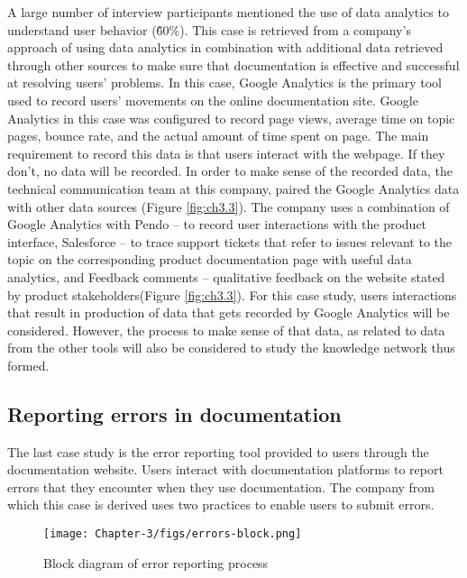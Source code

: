 A large number of interview participants mentioned the use of data analytics to understand user behavior (\~ 60\%). This case is retrieved from a company's approach of using data analytics in combination with additional data retrieved through other sources to make sure that documentation is effective and successful at resolving users' problems. In this case, Google Analytics is the primary tool used to record users' movements on the online documentation site. Google Analytics in this case was configured to record page views, average time on topic pages, bounce rate, and the actual amount of time spent on page. The main requirement to record this data is that users interact with the webpage. If they don't, no data will be recorded. In order to make sense of the recorded data, the technical communication team at this company, paired the Google Analytics data with other data sources (Figure \ref{fig:ch3.3}). The company uses a combination of Google Analytics with Pendo – to record user interactions with the product interface, Salesforce – to trace support tickets that refer to issues relevant to the topic on the corresponding product documentation page with useful data analytics, and Feedback comments – qualitative feedback on the website stated by product stakeholders(Figure \ref{fig:ch3.3}). For this case study, users interactions that result in production of data that gets recorded by Google Analytics will be considered. However, the process to make sense of that data, as related to data from the other tools will also be considered to study the knowledge network thus formed.

\subsection{Reporting errors in documentation}
The last case study is the error reporting tool provided to users through the documentation website. Users interact with documentation platforms to report errors that they encounter when they use documentation. The company from which this case is derived uses two practices to enable users to submit errors.

\begin{figure}[t]
  \begin{center}
      \texttt{[image: Chapter-3/figs/errors-block.png]}
  \end{center}
  \caption{Block diagram of error reporting process}
  \label{fig:ch3.4}
\end{figure}

